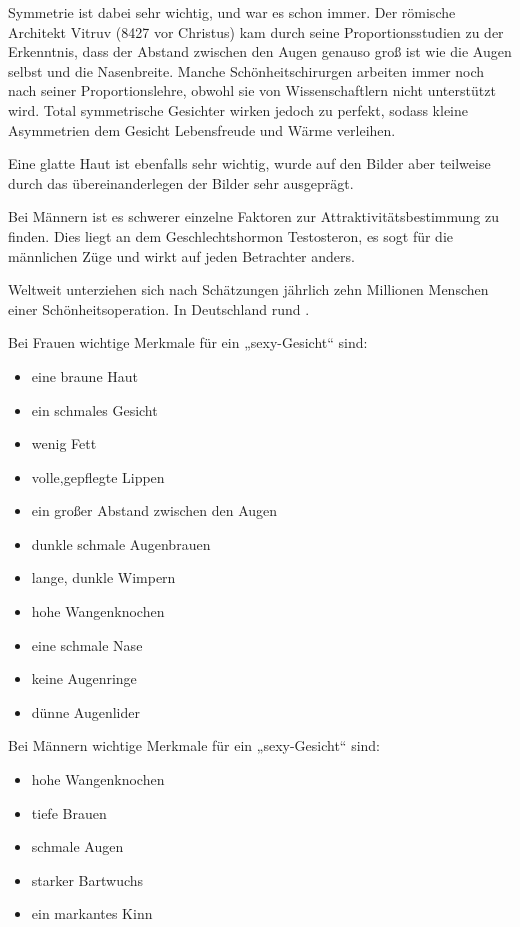 Symmetrie ist dabei sehr wichtig, und war es schon immer. Der römische Architekt Vitruv (8427 vor
Christus) kam durch seine Proportionsstudien zu der Erkenntnis, dass der Abstand zwischen den Augen
genauso groß ist wie die Augen selbst und die Nasenbreite.
Manche Schönheitschirurgen arbeiten immer noch nach seiner Proportionslehre, obwohl sie von
Wissenschaftlern nicht unterstützt wird. Total symmetrische Gesichter wirken jedoch zu perfekt,
sodass kleine Asymmetrien dem Gesicht Lebensfreude und Wärme verleihen.

Eine glatte Haut ist ebenfalls sehr wichtig, wurde auf den Bilder aber teilweise durch das
übereinanderlegen der Bilder sehr ausgeprägt.

Bei Männern ist es schwerer einzelne Faktoren zur Attraktivitätsbestimmung zu finden.
Dies liegt an dem Geschlechtshormon Testosteron, es sogt für die männlichen Züge und wirkt auf jeden
Betrachter anders.

Weltweit unterziehen sich nach Schätzungen jährlich zehn Millionen Menschen einer
Schönheitsoperation. In Deutschland rund .

Bei Frauen wichtige Merkmale für ein „sexy-Gesicht“ sind:
\begin{multicols}{2}
\begin{itemize}
	\item eine braune Haut
	\item ein schmales Gesicht
	\item wenig Fett
	\item volle,gepflegte Lippen
	\item ein großer Abstand zwischen den Augen
	\item dunkle schmale Augenbrauen
	\item lange, dunkle Wimpern
	\item hohe Wangenknochen
	\item eine schmale Nase
	\item keine Augenringe
	\item dünne Augenlider
\end{itemize}
\end{multicols}

Bei Männern wichtige Merkmale für ein „sexy-Gesicht“ sind:
\begin{multicols}{2}
\begin{itemize}
	\item hohe Wangenknochen
	\item tiefe Brauen
	\item schmale Augen
	\item starker Bartwuchs
	\item ein markantes Kinn
\end{itemize}
\end{multicols}


